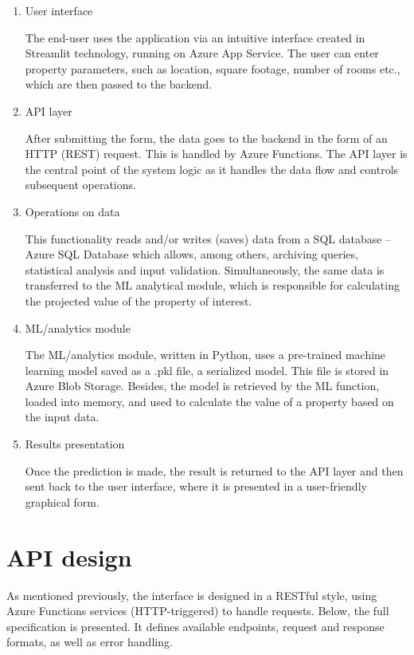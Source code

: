 \documentclass{article}
\begin{document}
\begin{enumerate}
    \item User interface 

The end-user uses the application via an intuitive interface created in Streamlit technology, running on Azure App Service. The user can enter property parameters, such as location, square footage, number of rooms etc., which are then passed to the backend. 

    
    \item API layer

After submitting the form, the data goes to the backend in the form of an HTTP (REST) request. This is handled by Azure Functions. The API layer is the central point of the system logic as it handles the data flow and controls subsequent operations.


    \item Operations on data 

This functionality reads and/or writes (saves) data from a SQL database -- Azure SQL Database which allows, among others, archiving queries, statistical analysis and input validation.
Simultaneously, the same data is transferred to the ML analytical module, which is responsible for calculating the projected value of the property of interest.

    \item ML/analytics module 

The ML/analytics module, written in Python, uses a pre-trained machine learning model saved as a .pkl file, a serialized model. This file is stored in Azure Blob Storage. Besides, the model is retrieved by the ML function, loaded into memory, and used to calculate the value of a property based on the input data.
    
    \item Results presentation

Once the prediction is made, the result is returned to the API layer and then sent back to the user interface, where it is presented in a user-friendly graphical form.

\end{enumerate}

\section{API design}

As mentioned previously, the interface is designed in a RESTful style, using Azure Functions services (HTTP-triggered) to handle requests. Below, the full specification is presented. It defines available endpoints, request and response formats, as well as error handling.  
\end{document}
